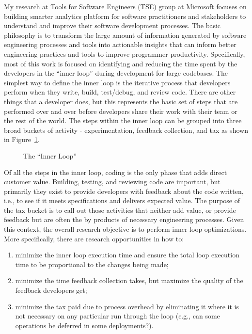 \documentclass[a4paper]{article}
\begin{document}
My research at Tools for Software Engineers (TSE) group at Microsoft focuses on
building smarter analytics platform for software practitioners and stakeholders
to understand and improve their software development processes. The basic philosophy
is to transform the large amount of information generated by software engineering processes
and tools into actionable insights that can inform better engineering practices and tools to improve programmer productivity. 
Specifically, most of this work is focused on identifying and reducing the time spent by the developers in the \enquote{inner loop} during development for large codebases. The simplest way to define the inner loop is the iterative process that developers perform when they write, build, test/debug, and review code. There are other things that a developer does, but this represents the basic set of steps that are performed over and over before developers share their work with their team or the rest of the world. The steps within the inner loop can be grouped into three broad buckets of activity - experimentation, feedback collection, and tax as shown in Figure~\ref{fig:innerloop}. 

\begin{figure}[h]
  \centering
  
\caption{The \enquote{Inner Loop}}
  \label{fig:innerloop}
\end{figure}


Of all the steps in the inner loop, coding is the only phase that adds direct customer value. Building, testing, and reviewing code are important, but primarily they exist to provide developers with feedback about the code written, i.e., to see if it meets specifications and delivers expected value.
The purpose of the tax bucket is to call out those activities that neither add value, or provide feedback but are often the by products of necessary engineering processes. %
Given this context, the overall research objective is to perform inner loop optimizations.  %
More specifically, there are research opportunities in how to:
\begin{enumerate}
\item minimize the inner loop execution time and ensure the total loop execution time to be proportional to the changes being made; 
\vspace{-5pt}\item minimize the time feedback collection takes, but maximize the quality of the feedback developers get; 
\vspace{-5pt}\item minimize the tax paid due to process overhead by eliminating it where it is not necessary on any particular run through the loop (e.g., can some operations be deferred in some deployments?).
\end{enumerate}
\end{document}
